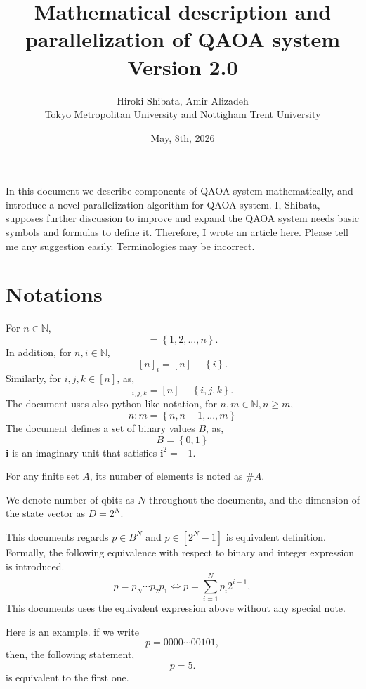 \documentclass[a4paper]{article}
\title{Mathematical description and parallelization of QAOA system\\Version 2.0}
\date{May, 8th, 2026}
\author{Hiroki Shibata, Amir Alizadeh\\Tokyo Metropolitan University and Nottigham Trent University}
\newcommand{\eqlabel}[1]{\label{#1}}
\newcommand{\cbr}[1]{\left\{#1\right\}}
\newcommand{\sN}{\mathbb{N}}
\begin{document}
\maketitle
In this document we describe components of QAOA system mathematically, and introduce a novel parallelization algorithm for QAOA system. I, Shibata, supposes further discussion to improve and expand the QAOA system needs basic symbols and formulas to define it. Therefore, I wrote an article here. Please tell me any suggestion easily.
Terminologies may be incorrect.

\section{Notations}
For \(n\in\sN\), 
\begin{equation}
    [n] = \cbr{1, 2, ..., n}. 
\end{equation}
In addition, for \(n, i\in \sN\),
\begin{equation}
    \eqlabel{eNn}
    [n]_i = [n]-\cbr{i}.
\end{equation}
Similarly, for \(i, j, k\in[n]\), as,
\begin{equation}
    [n]_{i,j,k} = [n]-\cbr{i,j,k}.
\end{equation}
The document uses also python like notation, for \(n, m\in\sN, n \geq m\),
\begin{equation}
    n:m = \cbr{n,n-1,...,m}
\end{equation}
The document defines a set of binary values \(B\), as,
\begin{equation}
    B = \cbr{0, 1}
\end{equation}
\(\mathbf{i}\) is an imaginary unit that satisfies \(\mathbf{i}^2 = -1\).

For any finite set \(A\), its number of elements is noted as \(\# A\).

We denote number of qbits as \(N\) throughout the documents, and the dimension of the state vector as \(D = 2^N\).

This documents regards \(p\in B^N\) and \(p\in [2^N-1]\) is equivalent definition. Formally, the following equivalence with respect to binary and integer expression is introduced.
\begin{equation}
    \eqlabel{e1}
p = p_N \cdots p_2p_1 \Leftrightarrow p = \sum_{i=1}^N p_i 2^{i-1},
\end{equation}
This documents uses the equivalent expression above without any special note.

Here is an example. if we write
\[
    p = 0000\cdots00101,
\]
then, the following statement,
\[
    p = 5.
\]
is equivalent to the first one.
\end{document}
